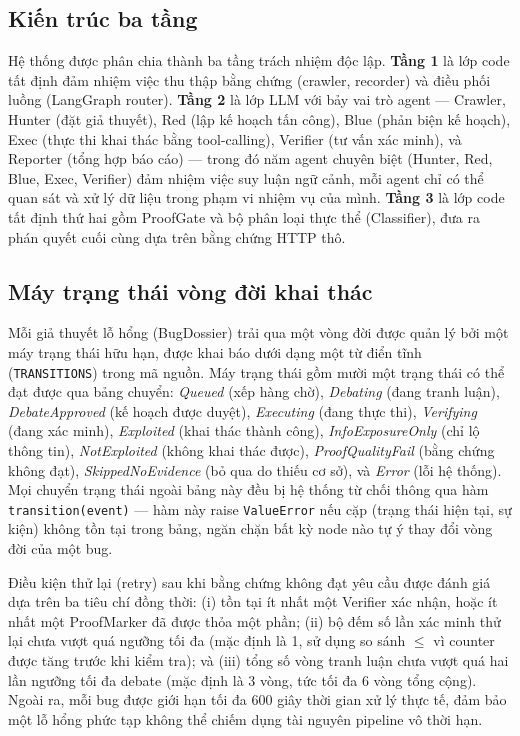 \subsection{Kiến trúc ba tầng}

Hệ thống được phân chia thành ba tầng trách nhiệm độc lập. \textbf{Tầng 1} là lớp code tất định đảm nhiệm việc thu thập bằng chứng (crawler, recorder) và điều phối luồng (LangGraph router). \textbf{Tầng 2} là lớp LLM với bảy vai trò agent --- Crawler, Hunter (đặt giả thuyết), Red (lập kế hoạch tấn công), Blue (phản biện kế hoạch), Exec (thực thi khai thác bằng tool-calling), Verifier (tư vấn xác minh), và Reporter (tổng hợp báo cáo) --- trong đó năm agent chuyên biệt (Hunter, Red, Blue, Exec, Verifier) đảm nhiệm việc suy luận ngữ cảnh, mỗi agent chỉ có thể quan sát và xử lý dữ liệu trong phạm vi nhiệm vụ của mình. \textbf{Tầng 3} là lớp code tất định thứ hai gồm ProofGate và bộ phân loại thực thể (Classifier), đưa ra phán quyết cuối cùng dựa trên bằng chứng HTTP thô.

\subsection{Máy trạng thái vòng đời khai thác}

Mỗi giả thuyết lỗ hổng (BugDossier) trải qua một vòng đời được quản lý bởi một máy trạng thái hữu hạn, được khai báo dưới dạng một từ điển tĩnh (\texttt{TRANSITIONS}) trong mã nguồn. Máy trạng thái gồm mười một trạng thái có thể đạt được qua bảng chuyển: \textit{Queued} (xếp hàng chờ), \textit{Debating} (đang tranh luận), \textit{DebateApproved} (kế hoạch được duyệt), \textit{Executing} (đang thực thi), \textit{Verifying} (đang xác minh), \textit{Exploited} (khai thác thành công), \textit{InfoExposureOnly} (chỉ lộ thông tin), \textit{NotExploited} (không khai thác được), \textit{ProofQualityFail} (bằng chứng không đạt), \textit{SkippedNoEvidence} (bỏ qua do thiếu cơ sở), và \textit{Error} (lỗi hệ thống). Mọi chuyển trạng thái ngoài bảng này đều bị hệ thống từ chối thông qua hàm \texttt{transition(event)} --- hàm này raise \texttt{ValueError} nếu cặp (trạng thái hiện tại, sự kiện) không tồn tại trong bảng, ngăn chặn bất kỳ node nào tự ý thay đổi vòng đời của một bug.

Điều kiện thử lại (retry) sau khi bằng chứng không đạt yêu cầu được đánh giá dựa trên ba tiêu chí đồng thời: (i) tồn tại ít nhất một Verifier xác nhận, hoặc ít nhất một ProofMarker đã được thỏa một phần; (ii) bộ đếm số lần xác minh thử lại chưa vượt quá ngưỡng tối đa (mặc định là 1, sử dụng so sánh $\leq$ vì counter được tăng trước khi kiểm tra); và (iii) tổng số vòng tranh luận chưa vượt quá hai lần ngưỡng tối đa debate (mặc định là 3 vòng, tức tối đa 6 vòng tổng cộng). Ngoài ra, mỗi bug được giới hạn tối đa 600 giây thời gian xử lý thực tế, đảm bảo một lỗ hổng phức tạp không thể chiếm dụng tài nguyên pipeline vô thời hạn.

